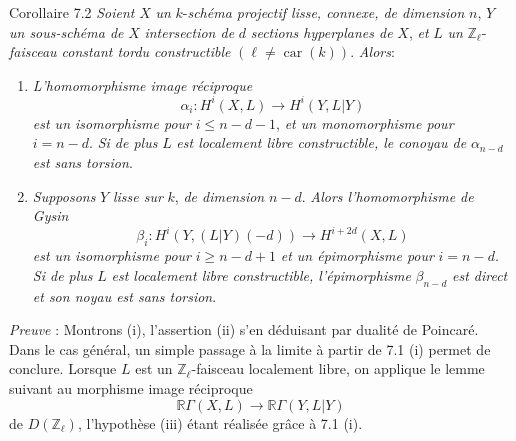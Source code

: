 \begin{statement}{Corollaire 7.2}
\emph{Soient} $X$ \emph{un} $k$-\emph{schéma projectif lisse, connexe, de dimension} $n$, $Y$ \emph{un sous-schéma de} $X$ \emph{intersection de} $d$ \emph{sections hyperplanes de} $X$, \emph{et} $L$ \emph{un} $\mathbb{Z}_\ell$-\emph{faisceau constant tordu constructible} $(\ell\ne\operatorname{car}(k))$. \emph{Alors}:
\begin{enumerate}[label=(\roman*)]
\item \emph{L'homomorphisme image réciproque}
\[
\alpha_i:H^i(X,L)\to H^i(Y,L|Y)
\]
\emph{est un isomorphisme pour} $i\le n-d-1$, \emph{et un monomorphisme pour} $i=n-d$. \emph{Si de plus} $L$ \emph{est localement libre constructible, le conoyau de} $\alpha_{n-d}$ \emph{est sans torsion}.
\item \emph{Supposons} $Y$ \emph{lisse sur} $k$, \emph{de dimension} $n-d$. \emph{Alors l'homomorphisme de Gysin}
\[
\beta_i:H^i(Y,(L|Y)(-d))\to H^{i+2d}(X,L)
\]
\emph{est un isomorphisme pour} $i\ge n-d+1$ \emph{et un épimorphisme pour} $i=n-d$. \emph{Si de plus} $L$ \emph{est localement libre constructible, l'épimorphisme} $\beta_{n-d}$ \emph{est direct et son noyau est sans torsion}.
\end{enumerate}
\end{statement}

\emph{Preuve} : Montrons (i), l'assertion (ii) s'en déduisant par dualité de Poincaré. Dans le cas général, un simple passage à la limite à partir de 7.1 (i) permet de conclure. Lorsque $L$ est un $\mathbb{Z}_\ell$-faisceau localement libre, on applique le lemme suivant au morphisme image réciproque
\[
\mathbb{R}\Gamma(X,L)\to \mathbb{R}\Gamma(Y,L|Y)
\]
de $D(\mathbb{Z}_\ell)$, l'hypothèse (iii) étant réalisée grâce à 7.1 (i).


